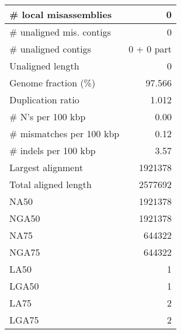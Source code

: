 \documentclass[12pt,a4paper]{article}
\begin{document}
\begin{table}[ht]
\begin{center}
\begin{tabular}{|l*{1}{|r}|}
\# local misassemblies & 0 \\ \hline
\# unaligned mis. contigs & 0 \\ \hline
\# unaligned contigs & 0 + 0 part \\ \hline
Unaligned length & 0 \\ \hline
Genome fraction (\%) & 97.566 \\ \hline
Duplication ratio & 1.012 \\ \hline
\# N's per 100 kbp & 0.00 \\ \hline
\# mismatches per 100 kbp & 0.12 \\ \hline
\# indels per 100 kbp & 3.57 \\ \hline
Largest alignment & 1921378 \\ \hline
Total aligned length & 2577692 \\ \hline
NA50 & 1921378 \\ \hline
NGA50 & 1921378 \\ \hline
NA75 & 644322 \\ \hline
NGA75 & 644322 \\ \hline
LA50 & 1 \\ \hline
LGA50 & 1 \\ \hline
LA75 & 2 \\ \hline
LGA75 & 2 \\ \hline
\end{tabular}
\end{center}
\end{table}
\end{document}
